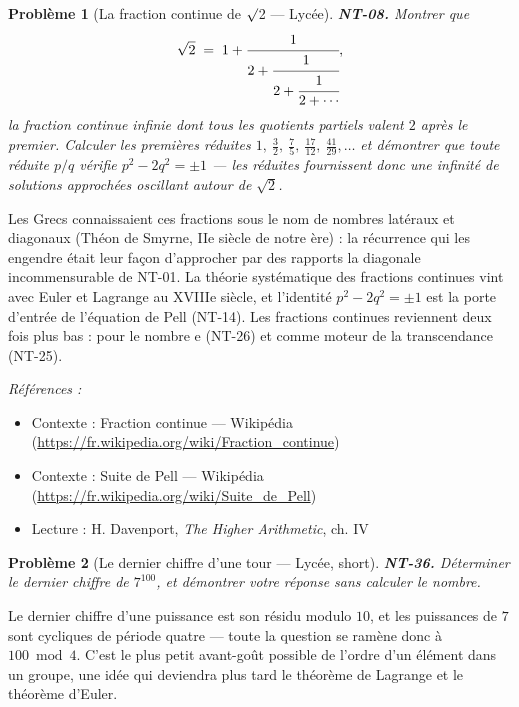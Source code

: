 \documentclass[11pt]{article}
\newtheorem{problem}{Problème}
\newenvironment{refs}{\par\small\noindent\emph{Références :}\begin{itemize}\setlength\itemsep{0pt}}{\end{itemize}\normalsize}
\begin{document}
\bigskip

\begin{problem}[{La fraction continue de $\surd$2 --- Lycée}]
\textbf{NT-08.} Montrer que
\[ \sqrt{2} \;=\; 1 + \cfrac{1}{2 + \cfrac{1}{2 + \cfrac{1}{2 + \cdots}}}, \]
la fraction continue infinie dont tous les quotients partiels valent $2$ après le premier.
Calculer les premières réduites
$1,\ \tfrac{3}{2},\ \tfrac{7}{5},\ \tfrac{17}{12},\ \tfrac{41}{29}, \ldots$ et démontrer
que toute réduite $p/q$ vérifie $p^2 - 2q^2 = \pm 1$ --- les réduites fournissent donc une
infinité de solutions approchées oscillant autour de $\sqrt{2}$.
\end{problem}

\noindent Les Grecs connaissaient ces fractions sous le nom de \og{} nombres latéraux et
diagonaux \fg{} (Théon de Smyrne, IIe siècle de notre ère) : la récurrence qui les engendre
était leur façon d'approcher par des rapports la diagonale incommensurable de NT-01. La théorie
systématique des fractions continues vint avec Euler et Lagrange au XVIIIe siècle, et
l'identité $p^2 - 2q^2 = \pm 1$ est la porte d'entrée de l'équation de Pell (NT-14). Les fractions
continues reviennent deux fois plus bas : pour le nombre e (NT-26) et comme moteur de la
transcendance (NT-25).

\begin{refs}
\item Contexte : Fraction continue --- Wikipédia (\url{https://fr.wikipedia.org/wiki/Fraction_continue})
\item Contexte : Suite de Pell --- Wikipédia (\url{https://fr.wikipedia.org/wiki/Suite_de_Pell})
\item Lecture : H. Davenport, \textit{The Higher Arithmetic}, ch. IV
\end{refs}

\bigskip

\begin{problem}[{Le dernier chiffre d'une tour --- Lycée, short}]
\textbf{NT-36.} Déterminer le dernier chiffre de $ 7^{100} $, et démontrer votre réponse sans calculer le nombre.
\end{problem}

\noindent Le dernier chiffre d'une puissance est son résidu modulo $ 10 $, et les puissances de $ 7 $ sont cycliques de période quatre --- toute la question se ramène donc à $ 100 \bmod 4 $. C'est le plus petit avant-goût possible de l'ordre d'un élément dans un groupe, une idée qui deviendra plus tard le théorème de Lagrange et le théorème d'Euler.
\end{document}
